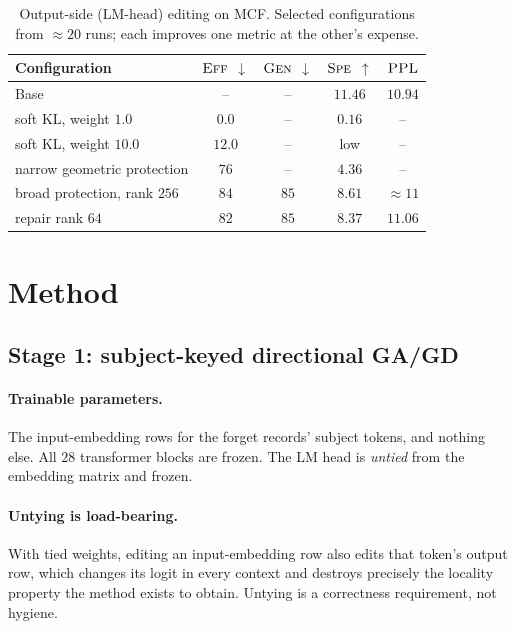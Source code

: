\documentclass[11pt]{article}
\newcommand{\Eff}{\textsc{Eff}}
\newcommand{\Gen}{\textsc{Gen}}
\newcommand{\Spe}{\textsc{Spe}}
\newcommand{\PPL}{\textsc{PPL}}
\newcommand{\down}{$\downarrow$}
\newcommand{\up}{$\uparrow$}
\begin{document}
\begin{table}[h]
\centering
\caption{Output-side (LM-head) editing on MCF. Selected configurations from
$\approx 20$ runs; each improves one metric at the other's expense.}
\label{tab:negative}
\begin{tabular}{lcccc}
\toprule
Configuration & $\Eff$ \down & $\Gen$ \down & $\Spe$ \up & $\PPL$ \\
\midrule
Base                          & --   & --   & $11.46$ & $10.94$ \\
soft KL, weight $1.0$         & $\mathbf{0.0}$ & --   & $0.16$ & -- \\
soft KL, weight $10.0$        & $12.0$ & --   & low    & -- \\
narrow geometric protection   & $76$   & --   & $4.36$ & -- \\
broad protection, rank $256$  & $84$   & $85$ & $8.61$ & $\approx 11$ \\
repair rank $64$              & $82$   & $85$ & $8.37$ & $11.06$ \\
\bottomrule
\end{tabular}
\end{table}

\section{Method}

\subsection{Stage 1: subject-keyed directional GA/GD}

\paragraph{Trainable parameters.} The input-embedding rows for the forget
records' subject tokens, and nothing else. All $28$ transformer blocks are
frozen. The LM head is \emph{untied} from the embedding matrix and frozen.

\paragraph{Untying is load-bearing.} With tied weights, editing an
input-embedding row also edits that token's output row, which changes its logit
in every context and destroys precisely the locality property the method exists
to obtain. Untying is a correctness requirement, not hygiene.
\end{document}
